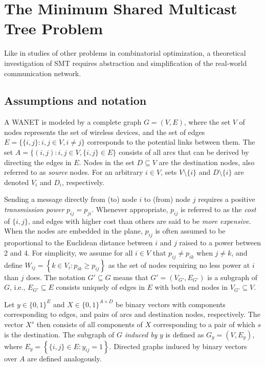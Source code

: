 \section{The Minimum Shared Multicast Tree Problem}
\label{sec:SBT}
Like in studies of other problems in combinatorial optimization,
a theoretical investigation of SMT requires abstraction and simplification of the real-world communication network.

\subsection{Assumptions and notation} \label{sec:notation}

A WANET is modeled by a complete graph $G=(V,E)$, where the set $V$ of nodes represents the set of wireless devices,
and the set of edges $E=\{\{i,j\}:i,j\in V, i\neq j\}$ corresponds to the potential links between them.
The set $A=\{(i,j):i,j\in V,\{i,j\}\in E\}$ consists of all arcs that can be derived by directing the edges in $E$.
Nodes in the set $D\subseteq V$ are the destination nodes, also referred to as \emph{source} nodes.
For an arbitrary $i\in V$, sets $V\setminus \{i\}$ and $D\setminus\{i\}$ are denoted $V_i$ and $D_i$, respectively.

Sending a message directly from (to) node $i$ to (from) node $j$ requires a positive \emph{transmission power} $p_{ij}=p_{ji}$.
Whenever appropriate, $p_{ij}$ is referred to as the \emph{cost} of $\{i,j\}$,
and edges with higher cost than others are said to be \emph{more expensive}.
When the nodes are embedded in the plane, $p_{ij}$ is often assumed \citep{Papadimitriou06SBT,Haugland12Dual,halgamuge} to be
proportional to the Euclidean distance between $i$ and $j$ raised to a power between 2 and 4.
For simplicity, we assume for all $i\in V$ that $p_{ij}\neq p_{ik}$ when $j\neq k$, and define
$W_{ij}=\left\{k\in V_i: p_{ik}\geq p_{ij}\right\}$
as the set of nodes requiring no less power at $i$ than $j$ does.
The notation $G'\subseteq G$ means that $G'=(V_{G'},E_{G'})$ is a subgraph of $G$, 
i.e., $E_{G'}\subseteq E$ consists uniquely of edges in $E$ with both end nodes in $V_{G'}\subseteq V$.

Let $y \in \{0,1\}^E$ and $X\in\{0,1\}^{A\times D}$ be binary vectors with components corresponding to edges,
and pairs of arcs and destination nodes, respectively.
The vector $X^s$ then consists of all components of $X$ corresponding to a pair of which $s$ is the destination.
The subgraph of $G$ \emph{induced by} $y$ is defined as $G_y=(V,E_y)$, where $E_y=\left\{\{i,j\}\in E: y_{ij}=1\right\}$.
Directed graphs induced by binary vectors over $A$ are defined analogously.


